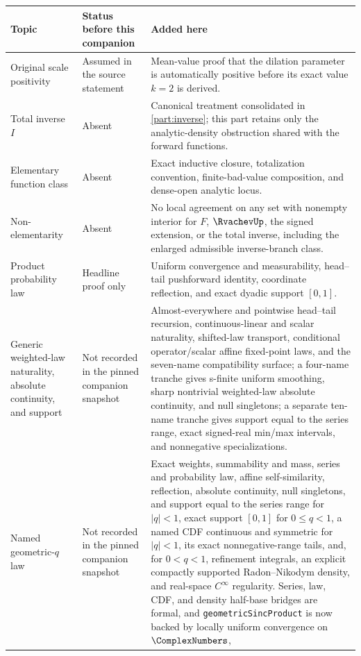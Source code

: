 \documentclass[11pt,oneside]{article}
\theoremstyle{definition}
\theoremstyle{remark}
\begin{document}
\begingroup\small
\begin{longtable}{@{}p{}p{}p{}@{}}
\toprule
Topic & Status before this companion & Added here\\
\midrule
\endhead
Original scale positivity & Assumed in the source statement & Mean-value proof that the dilation
parameter is automatically positive before its exact value $k=2$ is derived.\\
Total inverse $I$ & Absent & Canonical treatment consolidated in \cref{part:inverse}; this
part retains only the analytic-density obstruction shared with the forward functions.\\
Elementary function class & Absent & Exact inductive closure, totalization convention,
finite-bad-value composition, and dense-open analytic locus.\\
Non-elementarity & Absent & No local agreement on any set with nonempty interior for $F$,
$\RvachevUp$, the signed extension, or the total inverse, including the enlarged admissible
inverse-branch class.\\
Product probability law & Headline proof only & Uniform convergence and measurability,
head--tail pushforward identity, coordinate reflection, and exact dyadic support \([0,1]\).\\
Generic weighted-law naturality, absolute continuity, and support & Not recorded in the pinned companion snapshot &
Almost-everywhere and pointwise head--tail recursion, continuous-linear and scalar
naturality, shifted-law transport, conditional operator/scalar affine fixed-point laws, and
the seven-name compatibility surface; a four-name tranche gives s-finite uniform smoothing,
sharp nontrivial weighted-law absolute continuity, and null singletons; a separate ten-name
tranche gives support equal to the series range, exact signed-real min/max intervals, and
nonnegative specializations.\\
Named geometric-\(q\) law & Not recorded in the pinned companion snapshot &
Exact weights, summability and mass, series and probability law, affine self-similarity,
reflection, absolute continuity, null singletons, and support equal to the series range for
\(|q|<1\), exact support \([0,1]\) for \(0\le q<1\), a named CDF continuous and symmetric
for \(|q|<1\), its exact nonnegative-range tails, and, for \(0<q<1\), refinement integrals,
an explicit compactly supported Radon--Nikodym density, and real-space \(C^\infty\)
regularity.  Series, law, CDF, and density half-base bridges are formal, and
\texttt{geometricSincProduct} is now backed by locally uniform convergence on \(\ComplexNumbers\),

\end{longtable}
\end{document}
